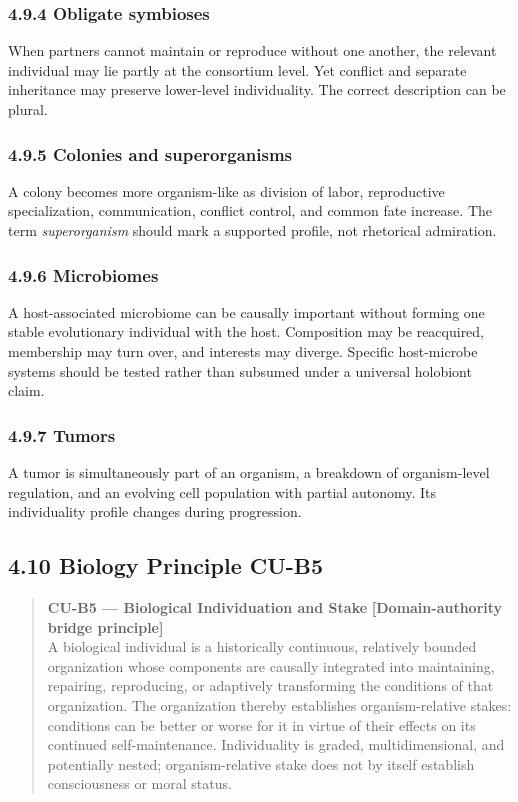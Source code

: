 \documentclass[
  11pt,
]{article}
\begin{document}
\subsubsection{4.9.4 Obligate symbioses}\label{obligate-symbioses}

When partners cannot maintain or reproduce without one another, the
relevant individual may lie partly at the consortium level. Yet conflict
and separate inheritance may preserve lower-level individuality. The
correct description can be plural.

\subsubsection{4.9.5 Colonies and
superorganisms}\label{colonies-and-superorganisms}

A colony becomes more organism-like as division of labor, reproductive
specialization, communication, conflict control, and common fate
increase. The term \emph{superorganism} should mark a supported profile,
not rhetorical admiration.

\subsubsection{4.9.6 Microbiomes}\label{microbiomes}

A host-associated microbiome can be causally important without forming
one stable evolutionary individual with the host. Composition may be
reacquired, membership may turn over, and interests may diverge.
Specific host-microbe systems should be tested rather than subsumed
under a universal holobiont claim.

\subsubsection{4.9.7 Tumors}\label{tumors}

A tumor is simultaneously part of an organism, a breakdown of
organism-level regulation, and an evolving cell population with partial
autonomy. Its individuality profile changes during progression.

\subsection{4.10 Biology Principle CU-B5}\label{biology-principle-cu-b5}

\begin{quote}
\textbf{CU-B5 --- Biological Individuation and Stake}
\textbf{{[}Domain-authority bridge principle{]}}\\
A biological individual is a historically continuous, relatively bounded
organization whose components are causally integrated into maintaining,
repairing, reproducing, or adaptively transforming the conditions of
that organization. The organization thereby establishes
organism-relative stakes: conditions can be better or worse for it in
virtue of their effects on its continued self-maintenance. Individuality
is graded, multidimensional, and potentially nested; organism-relative
stake does not by itself establish consciousness or moral status.
\end{quote}
\end{document}
